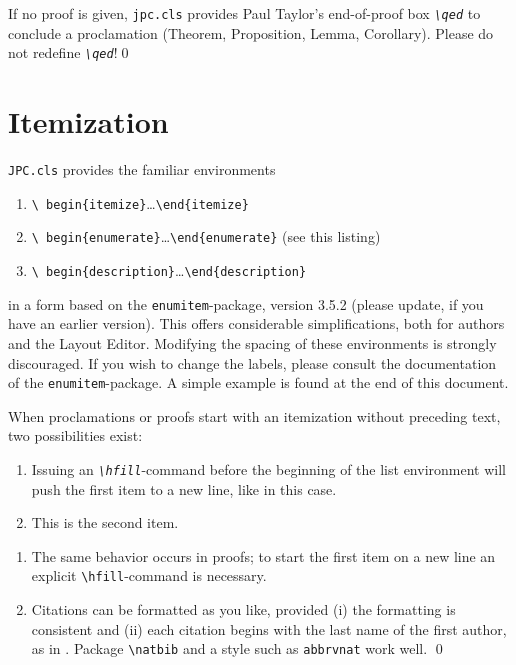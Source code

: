 \documentclass{jpc} %
\theoremstyle{plain}\newtheorem{satz}[thm]{Satz} %
\begin{document}
\begin{cor}\label{C:big}
  If no proof is given, \texttt{jpc.cls} provides Paul Taylor's
  end-of-proof box \emph{\texttt{\textbackslash qed}} to conclude a
  proclamation (Theorem, Proposition, Lemma, Corollary).  Please do
  not redefine \emph{\texttt{\textbackslash qed}}!\qed
\end{cor}

\section{Itemization}\label{S:item}
  \texttt{JPC.cls} provides the familiar environments 
\begin{enumerate}
\item\texttt{\textbackslash
  begin\{itemize\}}\dots\texttt{\textbackslash end\{itemize\}} 
\item\texttt{\textbackslash
  begin\{enumerate\}}\dots\texttt{\textbackslash end\{enumerate\}}
  (see this listing)
\item\texttt{\textbackslash
    begin\{description\}}\dots\texttt{\textbackslash end\{description\}}
\end{enumerate}
  in a form based on the \texttt{enumitem}-package, version 3.5.2
  (please update, if you have an earlier version).  This offers
  considerable simplifications, both for authors and the Layout
  Editor.  Modifying the spacing of these environments is strongly
  discouraged.  If you wish to change the labels, please consult the
  documentation of the \texttt{enumitem}-package.  A simple example is
  found at the end of this document.

  When proclamations or proofs start with an itemization without
  preceding text, two possibilities exist:

\begin{thm}\label{T:m}\hfill  %
\begin{enumerate}
\item
  Issuing an {\em\texttt{\textbackslash hfill}}-command before the
  beginning of the list environment will push the first item to a new
  line, like in this case.
\item
  This is the second item.
\end{enumerate}
\end{thm}

\proof\hfill  %
\begin{enumerate}
\item
  The same behavior occurs in proofs; to start the first item on a
  new line an explicit \texttt{\textbackslash hfill}-command is necessary.
\item
  Citations can be formatted as you like, provided (i) the formatting is consistent and (ii) each citation begins with the last name of the first author, as in \cite{Abowd:Nissim:Skinner:2009}. Package \texttt{\textbackslash natbib} and a style such as \texttt{abbrvnat} work well. \qed
\end{enumerate}
\end{document}
